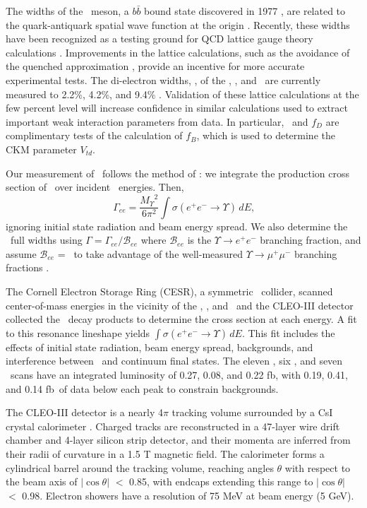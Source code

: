 \documentclass[aps,prl,superscriptaddress,showpacs,floatfix]{revtex4}
\begin{document}
The widths of the \ups\ meson, a $b\bar{b}$ bound state discovered in
1977 \cite{discovery}, are related to the quark-antiquark spatial wave
function at the origin \cite{wavefunction}.  Recently, these widths
have been recognized as a testing ground for QCD lattice gauge theory
calculations \cite{lattice}.  Improvements in the lattice
calculations, such as the avoidance of the quenched approximation
\cite{unquenched}, provide an incentive for more accurate experimental
tests.  The di-electron widths, \gee, of the \us, \uss, and \usss\ are
currently measured to 2.2\%, 4.2\%, and 9.4\% \cite{pdg}.  Validation
of these lattice calculations at the few percent level will increase
confidence in similar calculations used to extract important weak
interaction parameters from data.  In particular, \gee\ and $f_D$
\cite{fd} are complimentary tests of the calculation of
$f_B$, which is used to determine the CKM parameter $V_{td}$.

Our measurement of \gee\ follows the method of \cite{pdg}: we
integrate the production cross section of \ups\ over incident \ee\
energies.  Then,
\begin{equation}
\label{eqn:gee}
\Gamma_{ee} = \frac{{M_\Upsilon}^2}{6\pi^2}\int \sigma(e^+e^- \to
\Upsilon) \, dE \mbox{,}
\end{equation}
ignoring initial state radiation and beam energy spread.  We also
determine the \ups\ full widths using $\Gamma = \Gamma_{ee}/{\mathcal
B}_{ee}$ where ${\mathcal B}_{ee}$ is the $\Upsilon \to e^+e^-$
branching fraction, and assume ${\mathcal B}_{ee}$ = \bmm\ to take
advantage of the well-measured $\Upsilon \to \mu^+\mu^-$ branching
fractions \cite{istvan}.

The Cornell Electron Storage Ring (CESR), a symmetric \ee\ collider,
scanned center-of-mass energies in the vicinity of the \us, \uss, and
\usss\ and the CLEO-III detector collected the \ups\ decay products to
determine the cross section at each energy.  A fit to this resonance
lineshape yields $\int \sigma(e^+e^- \to \Upsilon) \, dE$.  This fit
includes the effects of initial state radiation, beam energy spread,
backgrounds, and interference between \ups\ and continuum final
states.  The eleven \us, six \uss, and seven \usss\ scans have an
integrated luminosity of 0.27, 0.08, and 0.22 fb\inv, with 0.19, 0.41,
and 0.14 fb\inv\ of data below each peak to constrain backgrounds.

The CLEO-III detector is a nearly 4$\pi$ tracking volume surrounded by
a CsI crystal calorimeter \cite{cleoiii}.  Charged tracks are
reconstructed in a 47-layer wire drift chamber and 4-layer silicon
strip detector, and their momenta are inferred from their radii of
curvature in a 1.5 T magnetic field.  The calorimeter forms a
cylindrical barrel around the tracking volume, reaching angles
$\theta$ with respect to the beam axis of $|\cos\theta|$ $<$ 0.85,
with endcaps extending this range to $|\cos\theta|$ $<$ 0.98.
Electron showers have a resolution of 75 MeV at beam energy (5 GeV).
\end{document}
